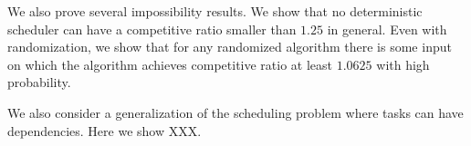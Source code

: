 We also prove several impossibility results.
We show that no deterministic scheduler can have a
competitive ratio smaller than $1.25$ in general.
Even with randomization, we show that for any randomized
algorithm there is some input on which the algorithm achieves
competitive ratio at least $1.0625$ with high probability.

We also consider a generalization of the scheduling problem where
tasks can have dependencies. Here we show XXX.
